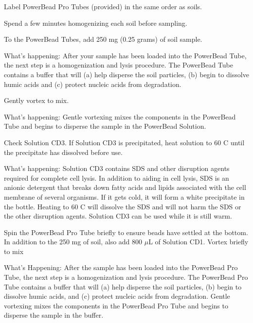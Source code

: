 \documentclass[12pt]{SOP5_beta}\usepackage[]{graphicx}\usepackage[]{xcolor}
\begin{document}
\NP Label PowerBead Pro Tubes (provided) in the same order as soils.

\NP Spend a few minutes homogenizing each soil before sampling.

\NP To the PowerBead Tubes, add 250 mg (0.25 grams) of soil sample.

\noindent What's happening: After your sample has been loaded into the PowerBead Tube, the next step is a homogenization and lysis procedure. The PowerBead
Tube contains a buffer that will (a) help disperse the soil particles, (b) begin to dissolve humic acids and (c) protect nucleic acids from degradation.

\NP Gently vortex to mix.

\noindent What's happening: Gentle vortexing mixes the components in the PowerBead Tube and begins to disperse the sample in the PowerBead Solution.

\NP Check Solution CD3. If Solution CD3 is precipitated, heat solution to 60 \degree C until the precipitate has dissolved before use.

\noindent What's happening: Solution CD3 contains SDS and other disruption agents required for complete cell lysis. In addition to aiding in cell lysis, SDS is an anionic detergent that breaks down fatty acids and lipids associated with the cell membrane of several organisms. If it gets cold, it will form a white precipitate in the bottle. Heating to 60 \degree C will dissolve the SDS and will not harm the SDS or the other disruption agents. Solution CD3 can be used while it is still warm.

\NP Spin the PowerBead Pro Tube briefly to ensure beads have settled at the bottom. In addition to the 250 mg of soil, also add 800 $\mu$L of Solution CD1. Vortex briefly to mix

\noindent What's Happening: After the sample has been loaded into the PowerBead Pro Tube, the next step is a homogenization and lysis procedure. The PowerBead Pro Tube contains a buffer that will (a) help disperse the soil particles, (b) begin to dissolve humic acids, and (c) protect nucleic acids from degradation. Gentle vortexing mixes the components in the PowerBead Pro Tube and begins to disperse the sample in the buffer.
\end{document}
